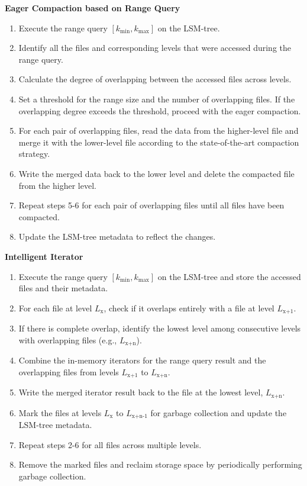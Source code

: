 \documentclass[balance=false, sigconf]{acmart}
\begin{document}
\textbf{Eager Compaction based on Range Query}
\begin{enumerate}
\item Execute the range query $[k_\text{min}, k_\text{max}]$ on the LSM-tree.
\item Identify all the files and corresponding levels that were accessed during the range query.
\item Calculate the degree of overlapping between the accessed files across levels.
\item Set a threshold for the range size and the number of overlapping files. If the overlapping degree exceeds the threshold, proceed with the eager compaction.
\item For each pair of overlapping files, read the data from the higher-level file and merge it with the lower-level file according to the state-of-the-art compaction strategy.
\item Write the merged data back to the lower level and delete the compacted file from the higher level.
\item Repeat steps 5-6 for each pair of overlapping files until all files have been compacted.
\item Update the LSM-tree metadata to reflect the changes.
\end{enumerate}

\textbf{Intelligent Iterator}
\begin{enumerate}
\item Execute the range query $[k_\text{min}, k_\text{max}]$ on the LSM-tree and store the accessed files and their metadata.
\item For each file at level $L_\text{x}$, check if it overlaps entirely with a file at level $L_\text{x+1}$.
\item If there is complete overlap, identify the lowest level among consecutive levels with overlapping files (e.g., $L_\text{x+n}$).
\item Combine the in-memory iterators for the range query result and the overlapping files from levels $L_\text{x+1}$ to $L_\text{x+n}$.
\item Write the merged iterator result back to the file at the lowest level, $L_\text{x+n}$.
\item Mark the files at levels $L_\text{x}$ to $L_\text{x+n-1}$ for garbage collection and update the LSM-tree metadata.
\item Repeat steps 2-6 for all files across multiple levels.
\item Remove the marked files and reclaim storage space by periodically performing garbage collection.
\end{enumerate}
\end{document}
